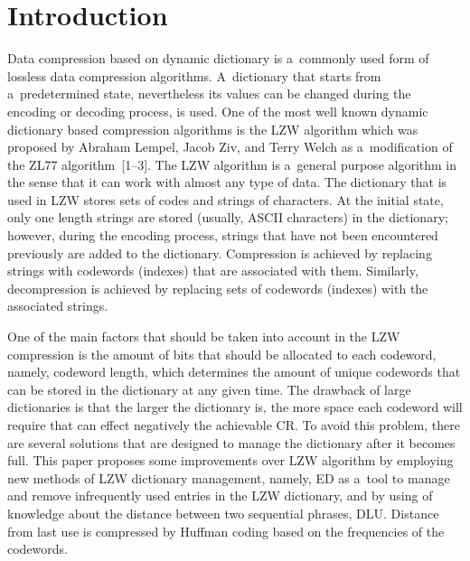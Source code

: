 

\vspace*{-6pt}



      \thispagestyle{myheadings}

      \begin{multicols}{2}

                  \label{st\stat}



\section{Introduction}

\noindent
Data compression based on dynamic dictionary is a~commonly used form of lossless 
data compression algorithms. A~dictionary that starts from a~predetermined state, 
nevertheless its values can be changed during the encoding or decoding process, 
is used. One of the most well known dynamic dictionary based compression algorithms 
is the LZW algorithm which was proposed by Abraham Lempel, 
Jacob Ziv, and Terry Welch as a~modification of the ZL77 algorithm~[1--3]. 
The {LZW} algorithm is a~general purpose algorithm in the sense that it can work with 
almost any type of data. The dictionary that is used in {LZW} stores sets of 
codes and strings of characters. At the initial state, only one length strings are 
stored (usually, ASCII characters) in the dictionary; however, during the encoding 
process, strings that have not been encountered previously are added to the dictionary. 
Compression is achieved by replacing strings with codewords (indexes) that are 
associated with them. Similarly, decompression is achieved by replacing sets of 
codewords (indexes) with the associated strings. 

One of the main factors that should 
be taken into account in the {LZW} compression is the amount of bits that 
should be allocated to each codeword, namely, codeword length, which determines 
the amount of unique codewords that can be stored in the dictionary at any given time. 
The drawback of large dictionaries is that the larger the dictionary is, the more 
space each codeword will require that can effect negatively the achievable 
CR. To avoid this problem, there are several solutions that are 
designed to manage the dictionary after it becomes full. 
This paper proposes some improvements  over {LZW} algorithm by employing  
new methods of  {LZW} dictionary management, namely, 
{ED} as a~tool to manage and remove infrequently used entries in the 
{LZW} dictionary, and  by using of knowledge about the distance  between 
two sequential phrases, DLU.
Distance from last use is compressed by Huffman coding based on the frequencies of the 
 codewords. 
 

\end{multicols}
